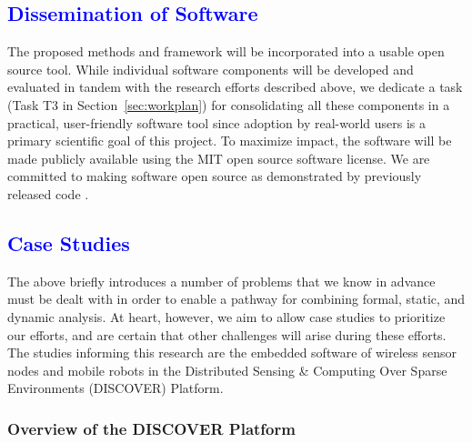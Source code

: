 

\subsection{\textcolor{blue}{Dissemination of Software}}
\label{sec:software}

The proposed methods and framework will be incorporated into a usable
open source tool.
While individual software components will be developed and evaluated
in tandem with the research efforts described above, we dedicate a
task (Task T3 in Section~\ref{sec:workplan}) for consolidating all
these components in a practical, user-friendly software tool since
adoption by real-world users is a primary scientific goal of this project.
To maximize impact, the software will be made publicly available %
using the MIT open source software license.
We are committed to making software open source as demonstrated by previously released %
code \cite{mleplussoftware, bernalMLEToolIntegrated2012a, openbuildnetsoftware, nghiemOpenBuildNetFrameworkDistributed2016}.


\subsection{\textcolor{blue}{Case Studies}} %
\label{sec:case-study}

The above briefly introduces a number of problems that we know in advance must
be dealt with in order to enable a pathway for combining formal,
static, and dynamic analysis.    At heart, however, we aim to allow
case studies to prioritize our efforts, and
are certain that other challenges will arise during these efforts.
The studies informing this research are the embedded software of %
wireless sensor nodes and mobile robots in the Distributed Sensing \& Computing Over Sparse Environments (DISCOVER) Platform.

\subsubsection{Overview of the DISCOVER Platform}
\label{sec:cast-study:discover}

